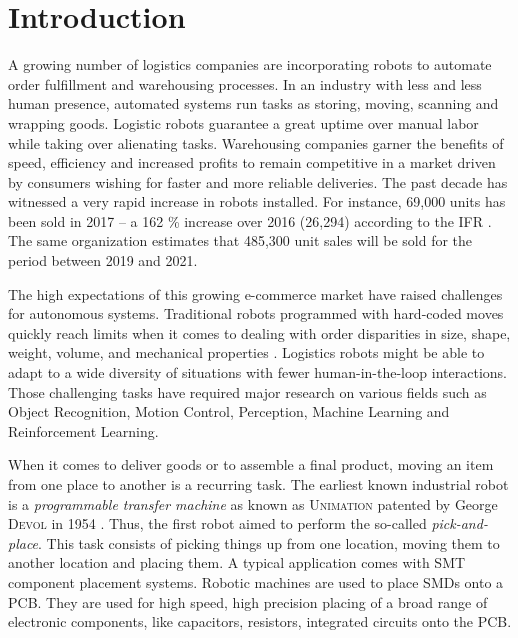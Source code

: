 \documentclass[/home/francois/latex/report/main.tex]{subfiles}
\begin{document}
\chapter{Introduction}
\label{chapter:introduction}

A growing number of logistics companies are incorporating robots to automate order fulfillment and warehousing processes. In an industry with less and less human presence, automated systems run tasks as storing, moving, scanning and wrapping goods. Logistic robots guarantee a great uptime over manual labor while taking over alienating tasks. Warehousing companies garner the benefits of speed, efficiency and increased profits to remain competitive in a market driven by consumers wishing for faster and more reliable deliveries. The past decade has witnessed a very rapid increase in robots installed. For instance, 69,000 units has been sold in 2017 – a 162 \% increase over 2016 (26,294) according to the \ac{IFR} \cite{industrialRobot2018}. The same organization estimates that 485,300 unit sales will be sold for the period between 2019 and 2021.

The high expectations of this growing e-commerce market have raised challenges for autonomous systems. Traditional robots programmed with hard-coded moves quickly reach limits when it comes to dealing with order disparities in size, shape, weight, volume, and mechanical properties \cite{GQHuang2015}. Logistics robots might be able to adapt to a wide diversity of situations with fewer human-in-the-loop interactions. Those challenging tasks have required major research on various fields such as Object Recognition, Motion Control, Perception, Machine Learning and Reinforcement Learning.

When it comes to deliver goods or to assemble a final product, moving an item from one place to another is a recurring task. The earliest known industrial robot is a \textit{programmable transfer machine} as known as \textsc{Unimation} patented by George \textsc{Devol} in 1954 \cite{Wallen2008}. Thus, the first robot aimed to perform the so-called \textit{pick-and-place}. This task consists of picking things up from one location, moving them to another location and placing them. A typical application comes with \ac{SMT} component placement systems. Robotic machines are used to place \ac{SMDs} onto a \ac{PCB}. They are used for high speed, high precision placing of a broad range of electronic components, like capacitors, resistors, integrated circuits onto the \ac{PCB}.
\end{document}
